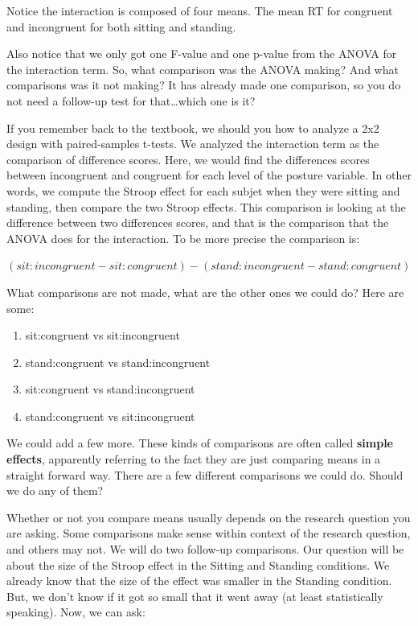 \documentclass[]{book}
\providecommand{\tightlist}{%
  \setlength{\itemsep}{0pt}\setlength{\parskip}{0pt}}
\theoremstyle{definition}
\theoremstyle{definition}
\theoremstyle{definition}
\theoremstyle{remark}
\begin{document}
Notice the interaction is composed of four means. The mean RT for
congruent and incongruent for both sitting and standing.

Also notice that we only got one F-value and one p-value from the ANOVA
for the interaction term. So, what comparison was the ANOVA making? And
what comparisons was it not making? It has already made one comparison,
so you do not need a follow-up test for that\ldots{}which one is it?

If you remember back to the textbook, we should you how to analyze a 2x2
design with paired-samples t-tests. We analyzed the interaction term as
the comparison of difference scores. Here, we would find the differences
scores between incongruent and congruent for each level of the posture
variable. In other words, we compute the Stroop effect for each subjet
when they were sitting and standing, then compare the two Stroop
effects. This comparison is looking at the difference between two
differences scores, and that is the comparison that the ANOVA does for
the interaction. To be more precise the comparison is:

\((sit:incongruent - sit:congruent) - (stand:incongruent - stand:congruent)\)

What comparisons are not made, what are the other ones we could do? Here
are some:

\begin{enumerate}
\def\labelenumi{\arabic{enumi}.}
\tightlist
\item
  sit:congruent vs sit:incongruent
\item
  stand:congruent vs stand:incongruent
\item
  sit:congruent vs stand:incongruent
\item
  stand:congruent vs sit:incongruent
\end{enumerate}

We could add a few more. These kinds of comparisons are often called
\textbf{simple effects}, apparently referring to the fact they are just
comparing means in a straight forward way. There are a few different
comparisons we could do. Should we do any of them?

Whether or not you compare means usually depends on the research
question you are asking. Some comparisons make sense within context of
the research question, and others may not. We will do two follow-up
comparisons. Our question will be about the size of the Stroop effect in
the Sitting and Standing conditions. We already know that the size of
the effect was smaller in the Standing condition. But, we don't know if
it got so small that it went away (at least statistically speaking).
Now, we can ask:
\end{document}
